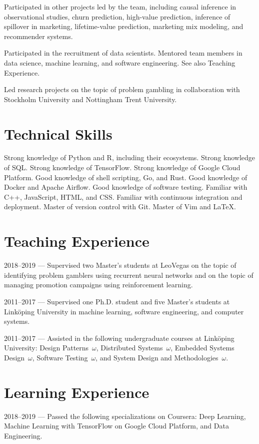 \documentclass[journal]{IEEEtran}
\begin{document}
Participated in other projects led by the team, including causal inference in
observational studies, churn prediction, high-value prediction, inference of
spillover in marketing, lifetime-value prediction, marketing mix modeling, and
recommender systems.

Participated in the recruitment of data scientists. Mentored team members in
data science, machine learning, and software engineering. See also Teaching
Experience.

Led research projects on the topic of problem gambling in collaboration with
Stockholm University and Nottingham Trent University.

\section{Technical Skills}
Strong knowledge of Python and R, including their ecosystems. Strong knowledge
of SQL. Strong knowledge of TensorFlow. Strong knowledge of Google Cloud
Platform. Good knowledge of shell scripting, Go, and Rust. Good knowledge of
Docker and Apache Airflow. Good knowledge of software testing. Familiar with
C++, JavaScript, HTML, and CSS. Familiar with continuous integration and
deployment. Master of version control with Git. Master of Vim and LaTeX.

\section{Teaching Experience}
2018--2019 --- Supervised two Master's students at LeoVegas on the topic of
identifying problem gamblers using recurrent neural networks and on the topic
of managing promotion campaigns using reinforcement learning.

2011--2017 --- Supervised one Ph.D. student and five Master's students at
Linköping University in machine learning, software engineering, and computer
systems.

2011--2017 --- Assisted in the following undergraduate courses at Linköping
University: Design Patterns~$\omega$, Distributed Systems~$\omega$, Embedded
Systems Design~$\omega$, Software Testing~$\omega$, and System Design and
Methodologies~$\omega$.

\section{Learning Experience}
2018--2019 --- Passed the following specializations on Coursera: Deep Learning,
Machine Learning with TensorFlow on Google Cloud Platform, and Data Engineering.
\end{document}
